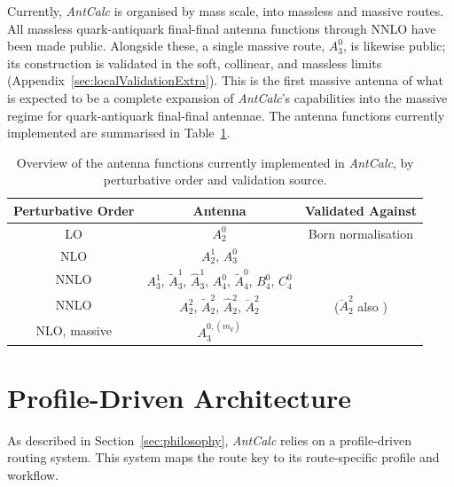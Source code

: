 Currently, \textit{AntCalc} is organised by mass scale, into massless and massive routes.
All massless quark-antiquark final-final antenna functions through NNLO have been made public.
Alongside these, a single massive route, $A_3^0$, is likewise public; its construction is validated in the soft, collinear, and massless limits (Appendix~\ref{sec:localValidationExtra}).
This is the first massive antenna of what is expected to be a complete
expansion of \textit{AntCalc}'s capabilities into the massive regime for quark-antiquark
final-final antennae.
The antenna functions currently implemented are summarised in Table~\ref{tab:antennaTiers}.

\begin{table}[h!]
\footnotesize
\centering
\caption{Overview of the antenna functions currently implemented in \textit{AntCalc}, by
  perturbative order and validation source.}
\renewcommand{\arraystretch}{1.3}
  \begin{tabular}{|c|c|c|}
   \hline
   \textbf{Perturbative Order} & \textbf{Antenna} & \textbf{Validated Against} \\
   \hline
   LO & $A_2^0$ & Born normalisation \\ \hline
   NLO & $A_2^1$, $A_3^0$ & \cite{Gehrmann-DeRidder:2005btv,Gehrmann-DeRidder:2004ttg} \\ \hline
   NNLO & $A_3^1$, $\tilde A_3^1$,
   $\hat A_3^1$, $A_4^0$, $\tilde A_4^0$, $B_4^0$, $C_4^0$ & \cite{Gehrmann-DeRidder:2005btv,Gehrmann-DeRidder:2004ttg} \\ \hline
   NNLO & $A_2^2$, $\tilde A_2^2$, $\hat A_2^2$, $\breve A_2^2$ & \cite{Gehrmann-DeRidder:2004ttg} ($\breve A_2^2$ also \cite{Jakubcik:2022zdi}) \\ \hline
   NLO, massive & $A_3^{0,(m_q)}$ & \cite{GehrmannDeRidder:2009fz} \\ \hline
  \end{tabular}
  
\label{tab:antennaTiers}
\end{table}

\section{Profile-Driven Architecture}\label{sec:profile}

As described in Section~\ref{sec:philosophy}, \textit{AntCalc} relies on a 
profile-driven routing system. This system maps the route key to its route-specific 
profile and workflow. 

